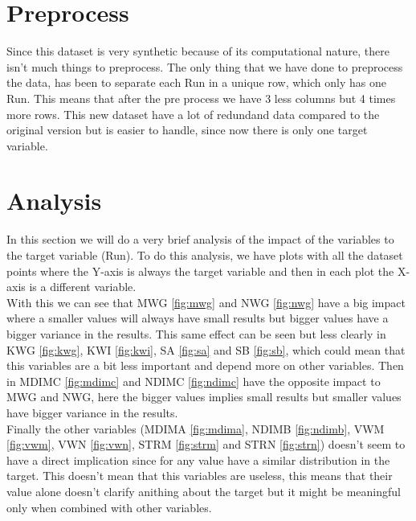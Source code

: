 \documentclass[sigconf,authorversion]{acmart}
\begin{document}
\section{Preprocess}
Since this dataset is very synthetic because of its computational nature, there isn't much things to preprocess. The only thing that we have done to preprocess the data, has been to separate each Run in a unique row, which only has one Run. This means that after the pre process we have 3 less columns but 4 times more rows. This new dataset have a lot of redundand data compared to the original version but is easier to handle, since now there is only one target variable.
\section{Analysis}
In this section we will do a very brief analysis of the impact of the variables to the target variable (Run). To do this analysis, we have plots with all the dataset points where the Y-axis is always the target variable and then in each plot the X-axis is a different variable.\\
With this we can see that MWG \ref{fig:mwg} and NWG \ref{fig:nwg} have a big impact where a smaller values will always have small results but bigger values have a bigger variance in the results. This same effect can be seen but less clearly in KWG \ref{fig:kwg}, KWI \ref{fig:kwi}, SA \ref{fig:sa} and SB \ref{fig:sb}, which could mean that this variables are a bit less important and depend more on other variables. Then in MDIMC \ref{fig:mdimc} and NDIMC \ref{fig:ndimc} have the opposite impact to MWG and NWG, here the bigger values implies small results but smaller values have bigger variance in the results.\\
Finally the other variables (MDIMA \ref{fig:mdima}, NDIMB \ref{fig:ndimb}, VWM \ref{fig:vwm}, VWN \ref{fig:vwn}, STRM \ref{fig:strm} and STRN \ref{fig:strn}) doesn't seem to have a direct implication since for any value have a similar distribution in the target. This doesn't mean that this variables are useless, this means that their value alone doesn't clarify anithing about the target but it might be meaningful only when combined with other variables.
\end{document}
